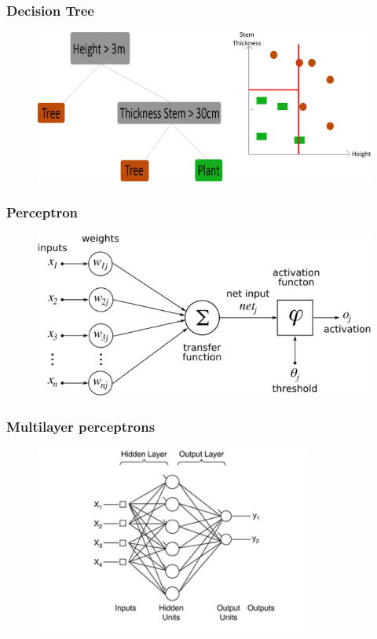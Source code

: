 \documentclass{beamer}
\begin{document}
\begin{frame}
\frametitle{Decision Tree}

	\begin{figure}
		\centering
   	 	\includegraphics[width=\textwidth,scale=1]{./img/DTExplained.png}
	\end{figure}

\end{frame}


\begin{frame} 
\frametitle{Perceptron}

	\begin{figure}
		\centering
    	\includegraphics[width=\textwidth]{./img/perceptron.png}
	\end{figure}

\end{frame}


\begin{frame}
\frametitle{Multilayer perceptrons}

	\begin{figure}
		\centering
    	\includegraphics[width=90mm,scale=1]{./img/MLP.jpg}
	\end{figure}

\end{frame}
\end{document}
